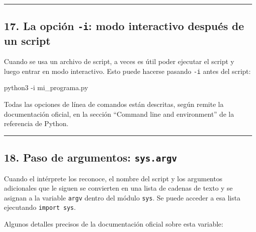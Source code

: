 \documentclass[
  doc,
  floatsintext,
  longtable,
  a4paper,
  nolmodern,
  notxfonts,
  notimes,
  12pt,
  colorlinks=true,linkcolor=blue,citecolor=blue,urlcolor=blue]{apa7}
\newenvironment{Shaded}{\begin{snugshade}}{\end{snugshade}}
\newcommand{\AttributeTok}[1]{\textcolor[rgb]{0.40,0.45,0.13}{#1}}
\newcommand{\ExtensionTok}[1]{\textcolor[rgb]{0.00,0.23,0.31}{#1}}
\newcommand{\NormalTok}[1]{\textcolor[rgb]{0.00,0.23,0.31}{#1}}
\begin{document}
\begin{center}\rule{0.5\linewidth}{0.5pt}\end{center}

\subsection{\texorpdfstring{17. La opción \texttt{-i}: modo interactivo
después de un
script}{17. La opción -i: modo interactivo después de un script}}\label{la-opciuxf3n--i-modo-interactivo-despuuxe9s-de-un-script}

Cuando se usa un archivo de script, a veces es útil poder ejecutar el
script y luego entrar en modo interactivo. Esto puede hacerse pasando
\texttt{-i} antes del script:

\begin{Shaded}
\begin{Highlighting}[]
\ExtensionTok{python3} \AttributeTok{{-}i}\NormalTok{ mi\_programa.py}
\end{Highlighting}
\end{Shaded}

Todas las opciones de línea de comandos están descritas, según remite la
documentación oficial, en la sección ``Command line and environment'' de
la referencia de Python.

\begin{center}\rule{0.5\linewidth}{0.5pt}\end{center}

\subsection{\texorpdfstring{18. Paso de argumentos:
\texttt{sys.argv}}{18. Paso de argumentos: sys.argv}}\label{paso-de-argumentos-sys.argv}

Cuando el intérprete los reconoce, el nombre del script y los argumentos
adicionales que le siguen se convierten en una lista de cadenas de texto
y se asignan a la variable \texttt{argv} dentro del módulo \texttt{sys}.
Se puede acceder a esa lista ejecutando \texttt{import\ sys}.

Algunos detalles precisos de la documentación oficial sobre esta
variable:
\end{document}
